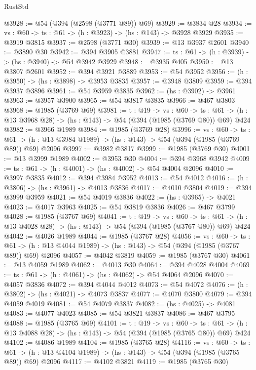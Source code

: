 \begin{lexlean}{RustStd}
\begin{coremodule}
{\begin{coremodule}
{{{{{{{{@3928 := @54 (@394 (@2598 (@3771 @89)) @69)
@3929 := @3834 @28
@3934 := {vs : @60} -> {ts : @61} -> (h : @3923) -> (hs : @143) -> @3928 @3929
@3935 := @3919 @3815
@3937 := @2598 (@3771 @30)
@3939 := @13 @3937 @2601
@3940 := @3890 @30
@3942 := @394 @3905 @3881
@3947 := {ts : @61} -> (h : @3939) -> (hs : @3940) -> @54 @3942 @3929
@3948 := @3935 @405
@3950 := @13 @3807 @2601
@3952 := @394 @3921 @3889
@3953 := @54 @3952
@3956 := (h : @3950) -> (hs : @3898) -> @3953 @3835
@3957 := @3948 @3809
@3959 := @394 @3937 @3896
@3961 := @54 @3959 @3835
@3962 := (hs : @3902) -> @3961
@3963 := @3957 @3900
@3965 := @54 @3817 @3835
@3966 := @467 @3803
@3968 := @1985 (@3769 @69)
@3981 := {t : @19} ->
  {vs : @60} ->
  {ts : @61} -> (h : @13 @3968 @28) -> (hs : @143) -> @54 (@394 (@1985 (@3769 @80)) @69) @424
@3982 := @3966 @1989
@3984 := @1985 (@3769 @28)
@3996 := {vs : @60} ->
  {ts : @61} -> (h : @13 @3984 @1989) -> (hs : @143) -> @54 (@394 (@1985 (@3769 @89)) @69) @2096
@3997 := @3982 @3817
@3999 := @1985 (@3769 @30)
@4001 := @13 @3999 @1989
@4002 := @3953 @30
@4004 := @394 @3968 @3942
@4009 := {ts : @61} -> (h : @4001) -> (hs : @4002) -> @54 @4004 @2096
@4010 := @3997 @3835
@4012 := @394 @3984 @3952
@4013 := @54 @4012
@4016 := (h : @3806) -> (hs : @3961) -> @4013 @3836
@4017 := @4010 @3804
@4019 := @394 @3999 @3959
@4021 := @54 @4019 @3836
@4022 := (hs : @3965) -> @4021
@4023 := @4017 @3963
@4025 := @54 @3819 @3836
@4026 := @467 @3799
@4028 := @1985 (@3767 @69)
@4041 := {t : @19} ->
  {vs : @60} ->
  {ts : @61} -> (h : @13 @4028 @28) -> (hs : @143) -> @54 (@394 (@1985 (@3767 @80)) @69) @424
@4042 := @4026 @1989
@4044 := @1985 (@3767 @28)
@4056 := {vs : @60} ->
  {ts : @61} -> (h : @13 @4044 @1989) -> (hs : @143) -> @54 (@394 (@1985 (@3767 @89)) @69) @2096
@4057 := @4042 @3819
@4059 := @1985 (@3767 @30)
@4061 := @13 @4059 @1989
@4062 := @4013 @30
@4064 := @394 @4028 @4004
@4069 := {ts : @61} -> (h : @4061) -> (hs : @4062) -> @54 @4064 @2096
@4070 := @4057 @3836
@4072 := @394 @4044 @4012
@4073 := @54 @4072
@4076 := (h : @3802) -> (hs : @4021) -> @4073 @3837
@4077 := @4070 @3800
@4079 := @394 @4059 @4019
@4081 := @54 @4079 @3837
@4082 := (hs : @4025) -> @4081
@4083 := @4077 @4023
@4085 := @54 @3821 @3837
@4086 := @467 @3795
@4088 := @1985 (@3765 @69)
@4101 := {t : @19} ->
  {vs : @60} ->
  {ts : @61} -> (h : @13 @4088 @28) -> (hs : @143) -> @54 (@394 (@1985 (@3765 @80)) @69) @424
@4102 := @4086 @1989
@4104 := @1985 (@3765 @28)
@4116 := {vs : @60} ->
  {ts : @61} -> (h : @13 @4104 @1989) -> (hs : @143) -> @54 (@394 (@1985 (@3765 @89)) @69) @2096
@4117 := @4102 @3821
@4119 := @1985 (@3765 @30)
}}}}}}}}
\end{coremodule}}
\end{coremodule}
\end{lexlean}
